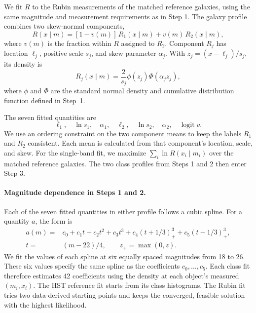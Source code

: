 We fit \(R\) to the Rubin measurements of the matched reference
galaxies, using the same magnitude and measurement requirements as in
Step 1. The galaxy profile combines two skew-normal components,
\begin{equation}
 R(x\mid m)=[1-v(m)]\,R_1(x\mid m)+v(m)\,R_2(x\mid m),
 \label{eq:v12-galaxy-profile}
\end{equation}
where \(v(m)\) is the fraction within \(R\) assigned to \(R_2\).
Component \(R_j\) has location \(\ell_j\), positive scale \(s_j\), and
skew parameter \(\alpha_j\). With \(z_j=(x-\ell_j)/s_j\), its density is
\begin{equation}
 R_j(x\mid m)=\frac{2}{s_j}\phi(z_j)\Phi(\alpha_j z_j),
\end{equation}
where \(\phi\) and \(\Phi\) are the standard normal density and
cumulative distribution function defined in Step~1.

The seven fitted quantities are
\begin{equation}
 \ell_1,\quad\ln s_1,\quad\alpha_1,\quad
 \ell_2,\quad\ln s_2,\quad\alpha_2,\quad\operatorname{logit}v.
\end{equation}
We use an ordering constraint on the two component means to keep the
labels \(R_1\) and \(R_2\) consistent. Each mean is calculated from that
component's location, scale, and skew. For the single-band fit, we maximize \(\sum_i \ln R(x_i\mid m_i)\)
over the matched reference galaxies.
The two class profiles from Steps 1 and 2 then enter Step 3.

\enlargethispage{2\baselineskip}
\begin{samepage}
\paragraph{Magnitude dependence in Steps 1 and 2.}
Each of the seven fitted quantities in either profile follows a cubic
spline. For a quantity \(a\), the form is
\begin{equation}
 \begin{split}
 a(m)={}&c_0+c_1t+c_2t^2+c_3t^3
      +c_4(t+1/3)_+^3+c_5(t-1/3)_+^3,\\
 t={}&(m-22)/4,\qquad z_+=\max(0,z).
 \end{split}
 \label{eq:v12-spline}
\end{equation}
We fit the values of each spline at six equally spaced magnitudes from
18 to 26. These six values specify the same spline as the coefficients
\(c_0,\ldots,c_5\). Each class fit therefore estimates 42 coefficients
using the density at each object's measured \((m_i,x_i)\). The HST
reference fit starts from its class histograms. The Rubin fit tries two
data-derived starting points and keeps the converged, feasible solution
with the highest likelihood.
\par
\end{samepage}


